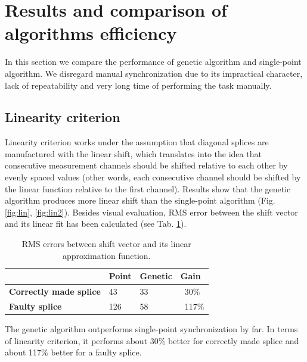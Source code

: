 \documentclass[applsci,article,preprint,moreauthors,pdftex]{Definitions/mdpi}
\begin{document}
\section{Results and comparison of algorithms efficiency}

In this section we compare the performance of genetic algorithm and single-point algorithm. We disregard manual synchronization due to its impractical character, lack of repeatability and very long time of performing the task manually.

\subsection{Linearity criterion}

Linearity criterion works under the assumption that diagonal splices are manufactured with the linear shift, which translates into the idea that consecutive measurement channels should be shifted relative to each other by evenly spaced values (other words, each consecutive channel should be shifted by the linear function relative to the first channel). Results show that the genetic algorithm produces more linear shift than the single-point algorithm (Fig. \ref{fig:lin}, \ref{fig:lin2}). Besides visual evaluation, RMS error between the shift vector and its linear fit has been calculated (see Tab. \ref{tab:tab2}). 

\begin{table}[ht!]
    \centering
    \caption{RMS errors between shift vector and its linear approximation function.}
    \begin{tabular}{|l|l|l|l|}
    \hline
         & \textbf{Point} & \textbf{Genetic} & \textbf{Gain} \\ \hline
          \textbf{Correctly made splice} & 43 & 33 & ~30\% \\ \hline
          \textbf{Faulty splice} & 126 & 58 & ~117\% \\ 
    \hline
    \end{tabular}
    \label{tab:tab2}
\end{table}

The genetic algorithm outperforms single-point synchronization by far. In terms of linearity criterion, it performs about 30\% better for correctly made splice and about 117\% better for a faulty splice.
\end{document}
